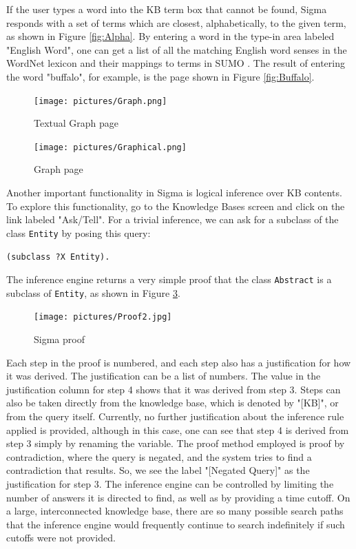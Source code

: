 \documentclass{book}
\begin{document}
If the user types a word into the KB term box that cannot be found, Sigma
responds with a set of terms which are closest, alphabetically, to the given
term, as shown in Figure \ref{fig:Alpha}. By entering a word in the type-in area
labeled "English Word", one can get a list of all the matching English word
senses in the WordNet lexicon and their mappings to terms in SUMO
\cite{np03}. The result of entering the word "buffalo", for
example, is the page shown in Figure \ref{fig:Buffalo}. 

\begin{figure}
  \centering
  \texttt{[image: pictures/Graph.png]}
  \caption{Textual Graph page}
  \label{fig:Graph}
\end{figure}

\begin{figure}
  \centering
  \texttt{[image: pictures/Graphical.png]}
  \caption{Graph page}
  \label{fig:Graphical}
\end{figure}

Another important
functionality in Sigma is logical inference over KB contents.  To explore
this functionality, go to the Knowledge Bases screen and click on the link
labeled "Ask/Tell".  For a trivial inference, we can ask for a subclass of the
class {\tt Entity} by posing this query:

\begin{verbatim}
(subclass ?X Entity).  
\end{verbatim}

The inference engine returns a very simple proof that the class {\tt Abstract} is a
subclass of {\tt Entity}, as shown in Figure \ref{fig:Proof}.

\begin{figure}
  \centering
  \texttt{[image: pictures/Proof2.jpg]}
  \caption{Sigma proof}
  \label{fig:Proof}
\end{figure}

Each step in the proof is numbered, and each step also has a justification for
how it was derived.  The justification can be a list of numbers.  The value in
the justification column for step 4 shows that it was derived from step 3.
Steps can also be taken directly from the knowledge base, which is denoted by
"[KB]", or from the query itself.  Currently, no further justification about
the inference rule applied is provided, although in this case, one can see that
step 4 is derived from step 3 simply by renaming the variable.  The proof method
employed is proof by contradiction, where the query is negated, and the system
tries to find a contradiction that results.  So, we see the label "[Negated
Query]" as the justification for step 3. The inference engine can be
controlled by limiting the number of answers it is directed to find, as well as
by providing a time cutoff.  On a large, interconnected knowledge base, there
are so many possible search paths that the inference engine would frequently
continue to search indefinitely if such cutoffs were not provided.
\end{document}
